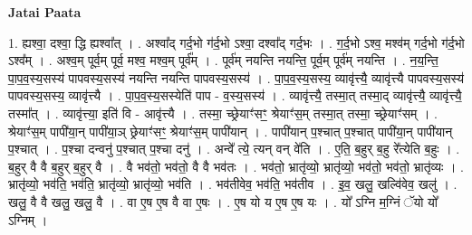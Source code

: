 \documentclass[17pt]{extarticle}
\begin{document}
\textbf{Jatai Paata} \newline

1. ह्यश्वा॒ दश्वा॒ द्धि ह्यश्वा᳚त् । . अश्वा᳚द् गर्द॒भो ग॑र्द॒भो ऽश्वा॒ दश्वा᳚द् गर्द॒भः । . ग॒र्द॒भो ऽश्व॒ मश्व॑म् गर्द॒भो ग॑र्द॒भो ऽश्व᳚म् । . अश्व॒म् पूर्व॒म् पूर्व॒ मश्व॒ मश्व॒म् पूर्व᳚म् । . पूर्व॑म् नयन्ति नयन्ति॒ पूर्व॒म् पूर्व॑म् नयन्ति । . न॒य॒न्ति॒ पा॒प॒व॒स्य॒सस्य॑ पापवस्य॒सस्य॑ नयन्ति नयन्ति पापवस्य॒सस्य॑ । . पा॒प॒व॒स्य॒सस्य॒ व्यावृ॑त्त्यै॒ व्यावृ॑त्त्यै पापवस्य॒सस्य॑ पापवस्य॒सस्य॒ व्यावृ॑त्त्यै । . पा॒प॒व॒स्य॒सस्येति॑ पाप - व॒स्य॒सस्य॑ । . व्यावृ॑त्त्यै॒ तस्मा॒त् तस्मा॒द् व्यावृ॑त्त्यै॒ व्यावृ॑त्त्यै॒ तस्मा᳚त् । . व्यावृ॑त्त्या॒ इति॑ वि - आवृ॑त्त्यै । . तस्मा॒ च्छ्रेयाꣳ॑सꣳ॒॒ श्रेयाꣳ॑स॒म् तस्मा॒त् तस्मा॒ च्छ्रेयाꣳ॑सम् । . श्रेयाꣳ॑स॒म् पापी॑या॒न् पापी॑या॒ञ् छ्रेयाꣳ॑सꣳ॒॒ श्रेयाꣳ॑स॒म् पापी॑यान् । . पापी॑यान् प॒श्चात् प॒श्चात् पापी॑या॒न् पापी॑यान् प॒श्चात् । . प॒श्चा दन्वनु॑ प॒श्चात् प॒श्चा दनु॑ । . अन्वे᳚ त्ये॒ त्यन् वन् वे॑ति । . ए॒ति॒ ब॒हुर् ब॒हु रे᳚त्येति ब॒हुः । . ब॒हुर् वै वै ब॒हुर् ब॒हुर् वै । . वै भव॑तो॒ भव॑तो॒ वै वै भव॑तः । . भव॑तो॒ भ्रातृ॑व्यो॒ भ्रातृ॑व्यो॒ भव॑तो॒ भव॑तो॒ भ्रातृ॑व्यः । . भ्रातृ॑व्यो॒ भव॑ति॒ भव॑ति॒ भ्रातृ॑व्यो॒ भ्रातृ॑व्यो॒ भव॑ति । . भव॑तीवेव॒ भव॑ति॒ भव॑तीव । . इ॒व॒ खलु॒ खल्वि॑वेव॒ खलु॑ । . खलु॒ वै वै खलु॒ खलु॒ वै । . वा ए॒ष ए॒ष वै वा ए॒षः । . ए॒ष यो य ए॒ष ए॒ष यः । . यो᳚ ऽग्नि म॒ग्निं ॅयो यो᳚ ऽग्निम् । \newline
\end{document}
